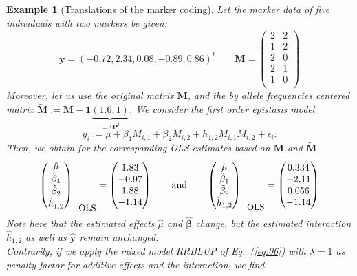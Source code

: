 \documentclass{bmcart}
\newcommand{\bb}{\bm{\beta}}
\newtheorem{example}{Example}
\newcommand{\M}{\mathbf{M}}
\newcommand{\0}{\mathbf{0}}
\renewcommand{\P}{\mathbf{P}}
\begin{document}
\begin{example}[Translations of the marker coding]\label{ex:06}
	Let the marker data of five individuals with two markers be given:
	$$\mathbf{y}= (-0.72,2.34,0.08,-0.89,0.86)^t \qquad 
	\M = \begin{pmatrix}
	2 & 2 \\
	1 & 2 \\
	2 & 0 \\
	2 & 1 \\
	1 & 0 \\
	\end{pmatrix} $$ 
	Moreover, let us use the original matrix $\M$, and the by allele frequencies centered matrix $\tilde{\M}:= \M - \mathbf{1}\underbrace{(1.6,1)}_{=:\P^t}$.
	We consider the first order epistasis model $$y_i := \mu + \beta_1 M_{i,1} + \beta_2 M_{i,2}  + h_{1,2} M_{i,1}M_{i,2} + \epsilon_i.$$
	Then, we obtain for the corresponding OLS estimates based on $\M$ and $\tilde{\M}$
	$$\begin{pmatrix}
	\hat{\mu} \\
	\hat{\beta}_1 \\
	\hat{\beta}_2 \\
	\hat{h}_{1,2}
	\end{pmatrix}_{\mbox{\small OLS}} = \begin{pmatrix}
	1.83 \\
	-0.97\\
	1.88 \\
	-1.14
	\end{pmatrix}
	\qquad \mbox{and} \qquad \begin{pmatrix}
	\tilde{\mu} \\
	\tilde{\beta}_1 \\
	\tilde{\beta}_2 \\
	\tilde{h}_{1,2}
	\end{pmatrix}_{\mbox{\small OLS}}= \begin{pmatrix}
	0.334\\
	-2.11 \\
	0.056 \\
	-1.14
	\end{pmatrix} $$
	Note here that the estimated effects $\hat{\mu}$ and $\hat{\bb}$ change, but the estimated interaction $\hat{h}_{1,2}$ as well as $\hat{\mathbf{y}}$ remain unchanged. \\
	
	
	Contrarily, if we apply the mixed model RRBLUP of Eq.~(\ref{eq:06}) with $\lambda=1$ as penalty factor for additive effects and the interaction, we find
	

\end{example}
\end{document}
